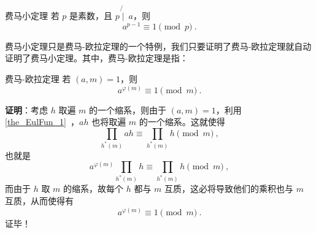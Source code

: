 

\begin{theorem}{费马小定理}
若 $p$ 是素数，且 $p \not{\mid}~ a$，则
\begin{equation}
a^{p-1} \equiv 1 \pmod p ~.
\end{equation}
\end{theorem}

费马小定理只是费马-欧拉定理的一个特例，我们只要证明了费马-欧拉定理就自动证明了费马小定理。其中，费马-欧拉定理是指：
\begin{theorem}{费马-欧拉定理}
若 $(a, m) = 1$，则
\begin{equation}
a^{\varphi(m)} \equiv 1 \pmod m ~.
\end{equation}
\end{theorem}
\addTODO{$\p$}

\textbf{证明}：考虑 $h$ 取遍 $m$ 的一个缩系，则由于 $(a, m) = 1$，利用\autoref{the_EulFun_1}~，$ah$ 也将取遍 $m$ 的一个缩系。这就使得
\begin{equation}
\prod_{h^*(m)}{a h} \equiv \prod _{h^*(m)}h \pmod m ~,
\end{equation}
也就是
\begin{equation}
a^{\varphi(m)} \prod_{h^*(m)} h \equiv \prod_{h^*(m)} h \pmod m ~,
\end{equation}
而由于 $h$ 取 $m$ 的缩系，故每个 $h$ 都与 $m$ 互质，这必将导致他们的乘积也与 $m$ 互质，从而使得有
\begin{equation}
a^{\varphi(m)} \equiv 1 \pmod m ~.
\end{equation}
证毕！


